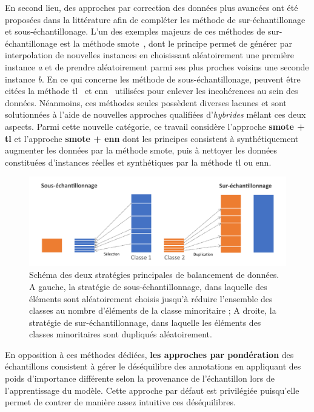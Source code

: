 En second lieu, des approches par correction des données plus avancées ont été proposées dans la littérature afin de compléter les méthode de sur-échantillonage et sous-échantillonage. L'un des exemples majeurs de ces méthodes de sur-échantillonage est la méthode \gls{smote}~\cite{Chawla2002}, dont le principe permet de générer par interpolation de nouvelles instances en choisissant aléatoirement une première instance \textit{a} et de prendre aléatoirement parmi ses plus proches voisins une seconde instance \textit{b}. En ce qui concerne les méthode de sous-échantillonage, peuvent être citées la méthode \gls{tl}~\cite{Tomek1976} et \gls{enn}~\cite{Wilson1972} utilisées pour enlever les incohérences au sein des données. Néanmoins, ces méthodes seules possèdent diverses lacunes et sont solutionnées à l'aide de nouvelles approches qualifiées d'\textit{hybrides} mêlant ces deux aspects. Parmi cette nouvelle catégorie, ce travail considère l'approche \textbf{\gls{smote} + \gls{tl}} et l'approche \textbf{\gls{smote} + \gls{enn}} dont les principes consistent à synthétiquement augmenter les données par la méthode \gls{smote}, puis à nettoyer les données constituées d'instances réelles et synthétiques par la méthode \gls{tl} ou \gls{enn}.

\begin{figure}[H]
    \centering
    \includegraphics[width=\linewidth]{contents/chapter_5/resources/scheme_data_balancing.pdf}
    \caption{Schéma des deux stratégies principales de balancement de données. A gauche, la stratégie de sous-échantillonnage, dans laquelle des éléments sont aléatoirement choisis jusqu'à réduire l'ensemble des classes au nombre d'éléments de la classe minoritaire ; A droite, la stratégie de sur-échantillonnage, dans laquelle les éléments des classes minoritaires sont dupliqués aléatoirement. }
    \label{fig:scheme_data_balancing}
\end{figure}\par

En opposition à ces méthodes dédiées, \textbf{les approches par pondération} des échantillons consistent à gérer le déséquilibre des annotations en appliquant des poids d'importance différente selon la provenance de l'échantillon lors de l'apprentissage du modèle. Cette approche par défaut est privilégiée puisqu'elle permet de contrer de manière assez intuitive ces déséquilibres.\par

